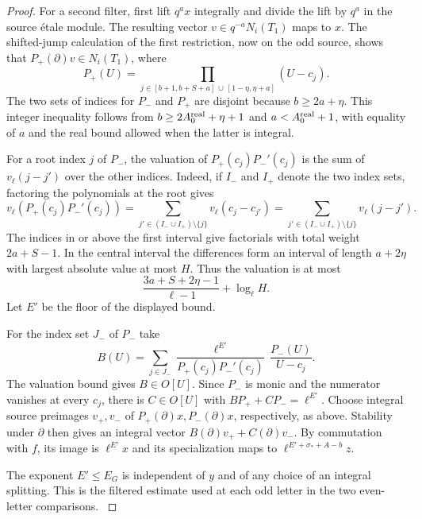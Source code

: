\begin{proof}
For a second filter, first lift \(q^a x\) integrally and divide
the lift by \(q^a\) in the source \'etale module.
The resulting vector \(v\in q^{-a}N_i(T_1)\) maps to \(x\).
The shifted-jump calculation of the first restriction, now
on the odd source, shows that \(P_+(\partial)v\in N_i(T_1)\),
where
\[
 P_+(U)=\prod_{j\in[b+1,b+S+a]\,\cup\,[1-\eta,\eta+a]}(U-c_j).
\]
The two sets of indices for \(P_-\) and \(P_+\) are disjoint
because \(b\ge 2a+\eta\). This integer inequality follows
from \(b\ge 2A_0^{\rm real}+\eta+1\) and
\(a<A_0^{\rm real}+1\), with equality of \(a\) and the
real bound allowed when the latter is integral.

For a root index \(j\) of \(P_-\), the valuation of
\(P_+(c_j)P_-'(c_j)\) is the sum of \(v_\ell(j-j')\)
over the other indices. Indeed, if \(I_-\) and \(I_+\) denote the two index sets, factoring
the polynomials at the root gives
\[
 v_\ell(P_+(c_j)P_-'(c_j))
 =\sum_{j'\in(I_-\cup I_+)\setminus\{j\}} v_\ell(c_j-c_{j'})
 =\sum_{j'\in(I_-\cup I_+)\setminus\{j\}} v_\ell(j-j') .
\]
The indices in or above the first interval give factorials
with total weight \(2a+S-1\). In the central interval the
differences form an interval of length \(a+2\eta\) with
largest absolute value at most \(H\).
Thus the valuation is at most
\[
           \frac{3a+S+2\eta-1}{\ell-1}+\log_\ell H .
\]
Let \(E'\) be the floor of the displayed bound.

For the index set \(J_-\) of \(P_-\) take
\[
 B(U)=\sum_{j\in J_-}
 \frac{\ell^{E'}}{P_+(c_j)P_-'(c_j)}\,\frac{P_-(U)}{U-c_j}.
\]
The valuation bound gives \(B\in O[U]\). Since \(P_-\) is monic
and the numerator vanishes at every \(c_j\), there is \(C\in O[U]\)
with \(BP_++CP_-=\ell^{E'}\). Choose integral source preimages
\(v_+,v_-\) of \(P_+(\partial)x,P_-(\partial)x\), respectively,
as above. Stability under \(\partial\) then gives an integral vector
\(B(\partial)v_++C(\partial)v_-\). By commutation with \(f\), its
image is \(\ell^{E'}x\) and its specialization maps to
\(\ell^{E'+\sigma_*+A-b}z\).

The exponent \(E'\le E_G\) is independent of \(y\)
and of any choice of an integral splitting. This is the
filtered estimate used at each odd letter in the two
even-letter comparisons.
\label{cor:inert-thick-filtered-1}
\end{proof}
